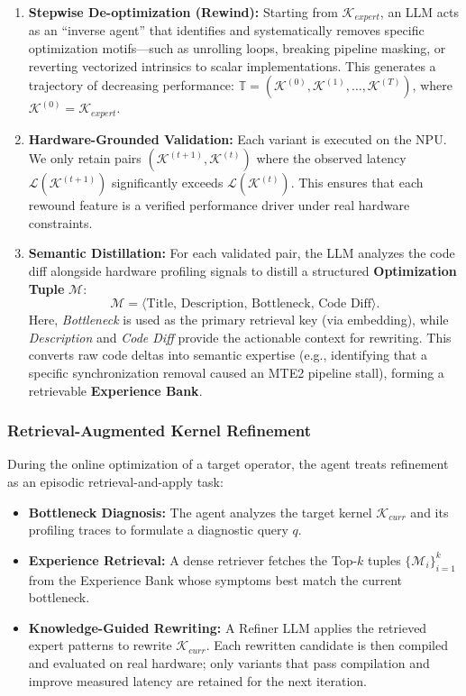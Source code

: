 \documentclass{article}
\theoremstyle{plain}
\theoremstyle{definition}
\theoremstyle{remark}
\begin{document}
\begin{enumerate}[leftmargin=*]
    \item \textbf{Stepwise De-optimization (Rewind):} Starting from $\mathcal{K}_{expert}$, an LLM acts as an ``inverse agent'' that identifies and systematically removes specific optimization motifs---such as unrolling loops, breaking pipeline masking, or reverting vectorized intrinsics to scalar implementations. This generates a trajectory of decreasing performance: $\mathbb{T} = (\mathcal{K}^{(0)}, \mathcal{K}^{(1)}, \dots, \mathcal{K}^{(T)})$, where $\mathcal{K}^{(0)} = \mathcal{K}_{expert}$.
    \item \textbf{Hardware-Grounded Validation:} Each variant is executed on the NPU. We only retain pairs $(\mathcal{K}^{(t+1)}, \mathcal{K}^{(t)})$ where the observed latency $\mathcal{L}(\mathcal{K}^{(t+1)})$ significantly exceeds $\mathcal{L}(\mathcal{K}^{(t)})$. This ensures that each rewound feature is a verified performance driver under real hardware constraints.
    \item \textbf{Semantic Distillation:} For each validated pair, the LLM analyzes the code diff alongside hardware profiling signals to distill a structured \textbf{Optimization Tuple} $\mathcal{M}$:
    \begin{equation}
        \mathcal{M} = \langle \text{Title, Description, Bottleneck, Code Diff} \rangle.
    \end{equation}
    Here, \textit{Bottleneck} is used as the primary retrieval key (via embedding), while \textit{Description} and \textit{Code Diff} provide the actionable context for rewriting. This converts raw code deltas into semantic expertise (e.g., identifying that a specific synchronization removal caused an MTE2 pipeline stall), forming a retrievable \textbf{Experience Bank}.
\end{enumerate}

\subsubsection{Retrieval-Augmented Kernel Refinement}
During the online optimization of a target operator, the agent treats refinement as an episodic retrieval-and-apply task:

\begin{itemize}[leftmargin=*]
    \item \textbf{Bottleneck Diagnosis:} The agent analyzes the target kernel $\mathcal{K}_{curr}$ and its profiling traces to formulate a diagnostic query $q$.
    \item \textbf{Experience Retrieval:} A dense retriever fetches the Top-$k$ tuples $\{\mathcal{M}_i\}_{i=1}^k$ from the Experience Bank whose symptoms best match the current bottleneck.
    \item \textbf{Knowledge-Guided Rewriting:} A Refiner LLM applies the retrieved expert patterns to rewrite $\mathcal{K}_{curr}$. Each rewritten candidate is then compiled and evaluated on real hardware; only variants that pass compilation and improve measured latency are retained for the next iteration.
\end{itemize}
\end{document}

